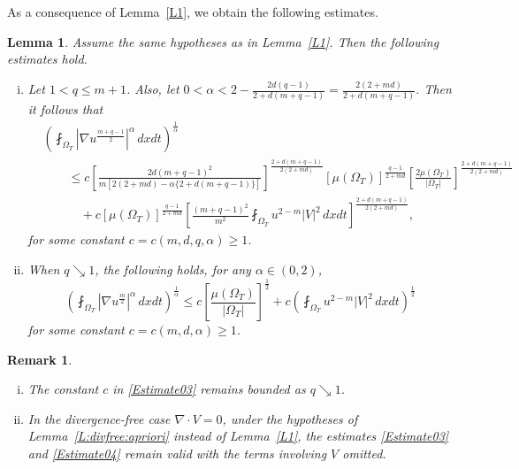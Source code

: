 \documentclass{amsart}
\newtheorem{lemma}[defn]{Lemma}
\newtheorem{remark}[defn]{Remark}
\numberwithin{equation}{section}
\begin{document}
As a consequence of Lemma~\ref{L1}, we obtain the following estimates.
\begin{lemma}\label{comparison estimates}
Assume the same hypotheses as in Lemma~\ref{L1}. Then the following estimates hold.
\begin{enumerate}[(i)]
  \item Let $1 < q \le m+1$. Also, let $0<\alpha < 2 - \frac{2d(q-1)}{2+d(m+q-1)} = \frac{2(2+md)}{2+d(m+q-1)}$. Then it follows that
	\begin{equation}\label{Estimate03}
\begin{aligned}
&\left(\fint_{\Omega_T} \left|\nabla u^{\frac{m+q-1}{2}}\right|^{\alpha} \,dxdt\right)^{\frac{1}{\alpha}} \\
&\qquad \le c \left[\frac{2d(m+q-1)^2}{m[2(2+md)-\alpha\{2+d(m+q-1)\}]}\right]^{\frac{2+d(m+q-1)}{2(2+md)}} [\mu(\Omega_{T})]^{\frac{q-1}{2+md}} \left[ \frac{2\mu(\Omega_{T})}{|\Omega_T|}\right]^{\frac{2+d(m+q-1)}{2(2+md)}}\\
&\qquad \quad + c [\mu(\Omega_{T})]^{\frac{q-1}{2+md}} \left[\frac{(m+q-1)^2}{m^2}\fint_{\Omega_T} u^{2-m} |V|^2 \,dxdt\right]^{\frac{2+d(m+q-1)}{2(2+md)}},
\end{aligned}
	\end{equation}
for some constant $c=c(m,d,q,\alpha)\ge 1$.
  \item When $q\searrow 1$, the following holds, for any $\alpha \in (0,2)$,
	\begin{equation}\label{Estimate04}
\left(\fint_{\Omega_T} \left|\nabla u^{\frac{m}{2}}\right|^{\alpha} \,dxdt\right)^{\frac{1}{\alpha}}
\le c \left[ \frac{\mu(\Omega_{T})}{|\Omega_T|}\right]^{\frac{1}{2}}+ c \left(\fint_{\Omega_T} u^{2-m} |V|^2 \,dxdt\right)^{\frac{1}{2}}
	\end{equation}
for some constant $c=c(m,d,\alpha)\ge 1$.
\end{enumerate}
\end{lemma}


\begin{remark}
\begin{enumerate}[(i)]
  \item The constant $c$ in \eqref{Estimate03} remains bounded as
  $q\searrow1$.

  \item In the divergence-free case $\nabla\cdot V=0$, under the hypotheses of
  Lemma~\ref{L:divfree:apriori} instead of Lemma~\ref{L1}, the estimates \eqref{Estimate03} and
  \eqref{Estimate04} remain valid with the terms involving $V$ omitted.
\end{enumerate}
\end{remark}
\end{document}
